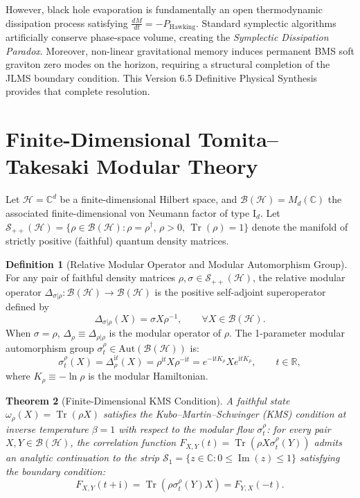 \documentclass[11pt,a4paper,reqno]{article}
\newtheorem{theorem}{Theorem}[section]
\theoremstyle{definition}
\newtheorem{definition}[theorem]{Definition}
\DeclareMathOperator{\Tr}{Tr}
\numberwithin{equation}{section}
\begin{document}
However, black hole evaporation is fundamentally an open thermodynamic dissipation process satisfying $\frac{dM}{dt} = -P_{\mathrm{Hawking}}$. Standard symplectic algorithms artificially conserve phase-space volume, creating the \textit{Symplectic Dissipation Paradox}. Moreover, non-linear gravitational memory induces permanent BMS soft graviton zero modes on the horizon, requiring a structural completion of the JLMS boundary condition. This Version 6.5 Definitive Physical Synthesis provides that complete resolution.

\section{Finite-Dimensional Tomita--Takesaki Modular Theory}
Let $\mathcal{H} = \mathbb{C}^d$ be a finite-dimensional Hilbert space, and $\mathcal{B}(\mathcal{H}) = M_d(\mathbb{C})$ the associated finite-dimensional von Neumann factor of type $\mathrm{I}_d$. Let $\mathcal{S}_{++}(\mathcal{H}) = \{ \rho \in \mathcal{B}(\mathcal{H}) : \rho = \rho^\dagger, \, \rho > 0, \, \Tr(\rho) = 1 \}$ denote the manifold of strictly positive (faithful) quantum density matrices.

\begin{definition}[Relative Modular Operator and Modular Automorphism Group]
For any pair of faithful density matrices $\rho, \sigma \in \mathcal{S}_{++}(\mathcal{H})$, the relative modular operator $\Delta_{\sigma|\rho} : \mathcal{B}(\mathcal{H}) \to \mathcal{B}(\mathcal{H})$ is the positive self-adjoint superoperator defined by
\begin{equation}
\Delta_{\sigma|\rho}(X) = \sigma X \rho^{-1}, \qquad \forall X \in \mathcal{B}(\mathcal{H}).
\end{equation}
When $\sigma = \rho$, $\Delta_\rho \equiv \Delta_{\rho|\rho}$ is the modular operator of $\rho$. The 1-parameter modular automorphism group $\sigma_t^\rho \in \mathrm{Aut}(\mathcal{B}(\mathcal{H}))$ is:
\begin{equation}
\sigma_t^\rho(X) = \Delta_\rho^{\mathrm{i}t}(X) = \rho^{\mathrm{i}t} X \rho^{-\mathrm{i}t} = e^{-\mathrm{i} t K_\rho} X e^{\mathrm{i} t K_\rho}, \qquad t \in \mathbb{R},
\end{equation}
where $K_\rho \equiv -\ln \rho$ is the modular Hamiltonian.
\end{definition}

\begin{theorem}[Finite-Dimensional KMS Condition]
A faithful state $\omega_\rho(X) = \Tr(\rho X)$ satisfies the Kubo--Martin--Schwinger (KMS) condition at inverse temperature $\beta = 1$ with respect to the modular flow $\sigma_t^\rho$: for every pair $X, Y \in \mathcal{B}(\mathcal{H})$, the correlation function $F_{X, Y}(t) = \Tr(\rho X \sigma_t^\rho(Y))$ admits an analytic continuation to the strip $\mathcal{S}_1 = \{ z \in \mathbb{C} : 0 \le \operatorname{Im}(z) \le 1 \}$ satisfying the boundary condition:
\begin{equation}
F_{X, Y}(t + \mathrm{i}) = \Tr(\rho \sigma_t^\rho(Y) X) = F_{Y, X}(-t).
\end{equation}
\end{theorem}
\end{document}
